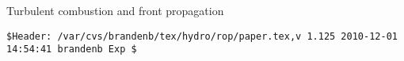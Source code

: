 \documentclass[12pt]{article}
\begin{document}
\begin{description}
Turbulent combustion and front propagation \citep{
2011arXiv1110.1163T,%
2011PhRvE..83a6304B,%
2011JCoPh.230....1B%
}

\end{description}

\def\nat    {Nature}
\def\apss   {Astrophys. Space Sci.}
\def\araa   {Ann.\ Rev.\ Astron.\ Astrophys.}
\def\prd    {Phys.\ Rev.\ D}
\def\pre    {Phys.\ Rev.\ E}
\def\apj    {Astrophys.\ J.}
\def\apjl   {Astrophys.\ J.\ Lett.}
\def\apjs   {Astrophys.\ J.\ Supp.}
\def\mnras  {Month.\ Not.\ Roy.\ Astron.\ Soc.}
\def\physrep{Phys.\ Rep.}
\def\aap    {Astron.\ Astrophys.}
\def\jgr    {J.\ Geophys.\ Res.}
\def\grl    {Geophys.\ Res.\ Lett.}
\def\solphys{Sol.\ Phys.}
\def\ssr    {Space Sci.\ Ref.}
\def\memsai {Mem.\ Soc.\ Astr.\ Ital.}



\vfill\bigskip\noindent\tiny\begin{verbatim}
$Header: /var/cvs/brandenb/tex/hydro/rop/paper.tex,v 1.125 2010-12-01 14:54:41 brandenb Exp $
\end{verbatim}
\end{document}
